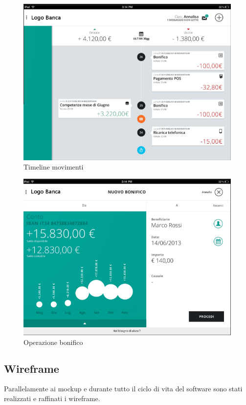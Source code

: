 \begin{figure}[!htbp]
\centering
\includegraphics[scale=0.7]{immagini_mockup/timeline.png}
\caption{Timeline movimenti}
\end{figure}

\begin{figure}[!h]
\centering
\includegraphics[scale=0.7]{immagini_mockup/bonifico.png}
\caption{Operazione bonifico}
\end{figure}

\newpage
\subsection{Wireframe}
Parallelamente ai mockup e durante tutto il ciclo di vita del software sono stati realizzati e raffinati i wireframe. 

